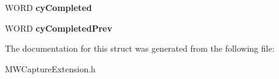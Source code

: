\begin{DoxyCompactItemize}
\item 
\hypertarget{struct__MWCAP__VIDEO__CAPTURE__STATUS_ac56938e4ef8422b0084ee58ef3f5b0a5}{W\-O\-R\-D {\bfseries cy\-Completed}}\label{struct__MWCAP__VIDEO__CAPTURE__STATUS_ac56938e4ef8422b0084ee58ef3f5b0a5}

\item 
\hypertarget{struct__MWCAP__VIDEO__CAPTURE__STATUS_a40b41bd158e6f60d2a3ced4b7be29dc1}{W\-O\-R\-D {\bfseries cy\-Completed\-Prev}}\label{struct__MWCAP__VIDEO__CAPTURE__STATUS_a40b41bd158e6f60d2a3ced4b7be29dc1}

\end{DoxyCompactItemize}


The documentation for this struct was generated from the following file\-:\begin{DoxyCompactItemize}
\item 
M\-W\-Capture\-Extension.\-h\end{DoxyCompactItemize}
